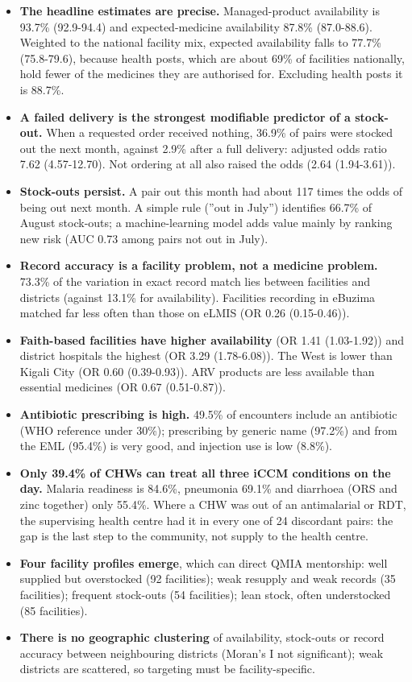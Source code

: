 \documentclass[10pt,a4paper]{article}
\begin{document}
\begin{itemize}\item \textbf{The headline estimates are precise.} Managed-product availability is 93.7\% (92.9-94.4) and expected-medicine availability 87.8\% (87.0-88.6). Weighted to the national facility mix, expected availability falls to 77.7\% (75.8-79.6), because health posts, which are about 69\% of facilities nationally, hold fewer of the medicines they are authorised for. Excluding health posts it is 88.7\%.
\item \textbf{A failed delivery is the strongest modifiable predictor of a stock-out.} When a requested order received nothing, 36.9\% of pairs were stocked out the next month, against 2.9\% after a full delivery: adjusted odds ratio 7.62 (4.57-12.70). Not ordering at all also raised the odds (2.64 (1.94-3.61)).
\item \textbf{Stock-outs persist.} A pair out this month had about 117 times the odds of being out next month. A simple rule (''out in July'') identifies 66.7\% of August stock-outs; a machine-learning model adds value mainly by ranking new risk (AUC 0.73 among pairs not out in July).
\item \textbf{Record accuracy is a facility problem, not a medicine problem.} 73.3\% of the variation in exact record match lies between facilities and districts (against 13.1\% for availability). Facilities recording in eBuzima matched far less often than those on eLMIS (OR 0.26 (0.15-0.46)).
\item \textbf{Faith-based facilities have higher availability} (OR 1.41 (1.03-1.92)) and district hospitals the highest (OR 3.29 (1.78-6.08)). The West is lower than Kigali City (OR 0.60 (0.39-0.93)). ARV products are less available than essential medicines (OR 0.67 (0.51-0.87)).
\item \textbf{Antibiotic prescribing is high.} 49.5\% of encounters include an antibiotic (WHO reference under 30\%); prescribing by generic name (97.2\%) and from the EML (95.4\%) is very good, and injection use is low (8.8\%).
\item \textbf{Only 39.4\% of CHWs can treat all three iCCM conditions on the day.} Malaria readiness is 84.6\%, pneumonia 69.1\% and diarrhoea (ORS and zinc together) only 55.4\%. Where a CHW was out of an antimalarial or RDT, the supervising health centre had it in every one of 24 discordant pairs: the gap is the last step to the community, not supply to the health centre.
\item \textbf{Four facility profiles emerge}, which can direct QMIA mentorship: well supplied but overstocked (92 facilities); weak resupply and weak records (35 facilities); frequent stock-outs (54 facilities); lean stock, often understocked (85 facilities).
\item \textbf{There is no geographic clustering} of availability, stock-outs or record accuracy between neighbouring districts (Moran's I not significant); weak districts are scattered, so targeting must be facility-specific.
\end{itemize}
\end{document}
